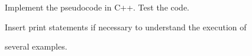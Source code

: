 Implement the pseudocode in C++. Test the code.

Insert print statements if necessary to understand the execution of

several examples.

